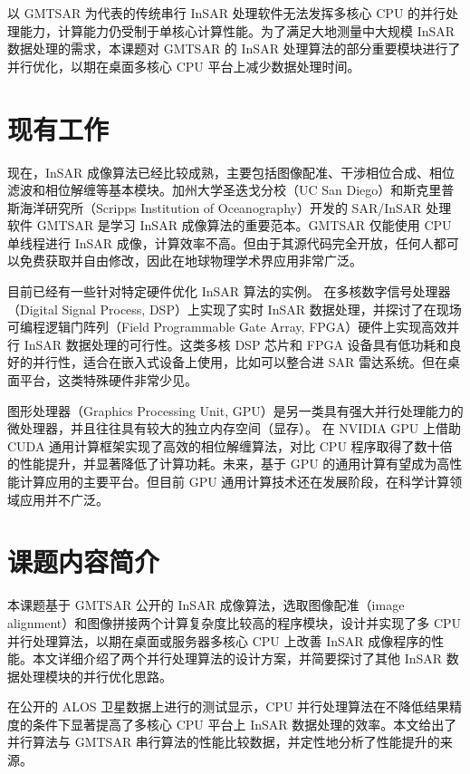 以 GMTSAR 为代表的传统串行 InSAR 处理软件无法发挥多核心 CPU 的并行处理能力，计算能力仍受制于单核心计算性能。为了满足大地测量中大规模 InSAR 数据处理的需求，本课题对 GMTSAR 的 InSAR 处理算法的部分重要模块进行了并行优化，以期在桌面多核心 CPU 平台上减少数据处理时间。

\section{现有工作}

现在，InSAR 成像算法已经比较成熟，主要包括图像配准、干涉相位合成、相位滤波和相位解缠等基本模块。加州大学圣迭戈分校（UC San Diego）和斯克里普斯海洋研究所（Scripps Institution of Oceanography）开发的 SAR/InSAR 处理软件 GMTSAR 是学习 InSAR 成像算法的重要范本。GMTSAR 仅能使用 CPU 单线程进行 InSAR 成像，计算效率不高。但由于其源代码完全开放，任何人都可以免费获取并自由修改，因此在地球物理学术界应用非常广泛。

目前已经有一些针对特定硬件优化 InSAR 算法的实例。\citet{shayu2014} 在多核数字信号处理器（Digital Signal Process, DSP）上实现了实时 InSAR 数据处理，并探讨了在现场可编程逻辑门阵列（Field Programmable Gate Array, FPGA）硬件上实现高效并行 InSAR 数据处理的可行性。这类多核 DSP 芯片和 FPGA 设备具有低功耗和良好的并行性，适合在嵌入式设备上使用，比如可以整合进 SAR 雷达系统。但在桌面平台，这类特殊硬件非常少见。

图形处理器（Graphics Processing Unit, GPU）是另一类具有强大并行处理能力的微处理器，并且往往具有较大的独立内存空间（显存）。\citet{reza2015accelerating} 在 NVIDIA GPU 上借助 CUDA 通用计算框架实现了高效的相位解缠算法，对比 CPU 程序取得了数十倍的性能提升，并显著降低了计算功耗。未来，基于 GPU 的通用计算有望成为高性能计算应用的主要平台。但目前 GPU 通用计算技术还在发展阶段，在科学计算领域应用并不广泛。

\section{课题内容简介}

本课题基于 GMTSAR 公开的 InSAR 成像算法，选取图像配准（image alignment）和图像拼接两个计算复杂度比较高的程序模块，设计并实现了多 CPU 并行处理算法，以期在桌面或服务器多核心 CPU 上改善 InSAR 成像程序的性能。本文详细介绍了两个并行处理算法的设计方案，并简要探讨了其他 InSAR 数据处理模块的并行优化思路。

在公开的 ALOS 卫星数据上进行的测试显示，CPU 并行处理算法在不降低结果精度的条件下显著提高了多核心 CPU 平台上 InSAR 数据处理的效率。本文给出了并行算法与 GMTSAR 串行算法的性能比较数据，并定性地分析了性能提升的来源。

